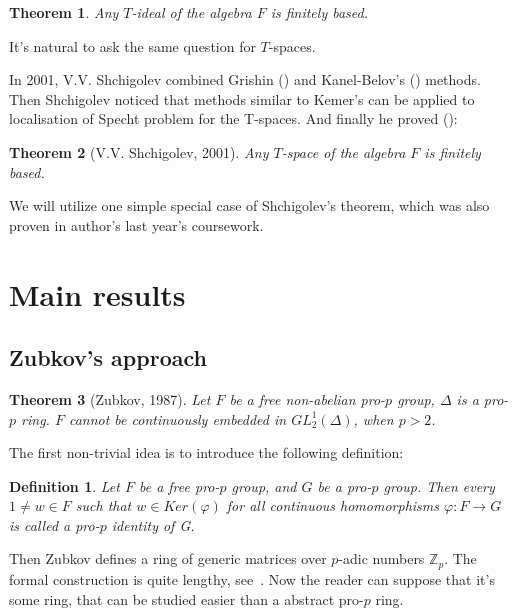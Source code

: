 \documentclass[12pt,a4paper]{article}
\newtheorem*{theorem*}{Theorem}
\newtheorem{definition}{Definition}[subsection]
\begin{document}
    \vskip 0.1in\noindent
    \begin{theorem*}
        Any $T$-ideal of the algebra $F$ is finitely based.
    \end{theorem*}
    \vskip 0.1in\noindent

    It's natural to ask the same question for $T$-spaces.

    In 2001, V.V. Shchigolev combined Grishin (\cite{Grishin}) and Kanel-Belov's (\cite{Kanel}) methods.
    Then Shchigolev noticed that methods similar to Kemer's can be applied to localisation of Specht problem for the T-spaces.
    And finally he proved (\cite{Shchigolev}):

    \vskip 0.1in\noindent
    \begin{theorem*} [V.V. Shchigolev, 2001]
        Any $T$-space of the algebra $F$ is finitely based.
    \end{theorem*}
    \vskip 0.1in\noindent

    We will utilize one simple special case of Shchigolev's theorem, which was also proven in author's last year's coursework.


    \section{Main results}

    \subsection{Zubkov's approach}

    \begin{theorem*}[Zubkov, 1987]
        Let $F$ be a free non-abelian pro-$p$ group, $\Delta$ is a pro-$p$ ring.
        $F$ cannot be continuously embedded in $GL^1_2(\Delta)$, when $p>2$.
    \end{theorem*}
    \vskip 0.1in\noindent

    The first non-trivial idea is to introduce the following definition:
    \vskip 0.1in\noindent
    \begin{definition}
        Let $F$ be a free pro-$p$ group, and $G$ be a pro-$p$ group.
        Then every $1\neq w\in F$ such that $w\in Ker(\varphi)$ for all continuous homomorphisms $\varphi: F\to G$ is called a pro-$p$ identity of G.
    \end{definition}
    \vskip 0.1in\noindent
    Then Zubkov defines a ring of generic matrices over $p$-adic numbers $\mathbb{Z}_p$. The formal construction is quite lengthy, see~\cite{Zubkov}.
    Now the reader can suppose that it's some ring, that can be studied easier than a abstract pro-$p$ ring.
\end{document}
